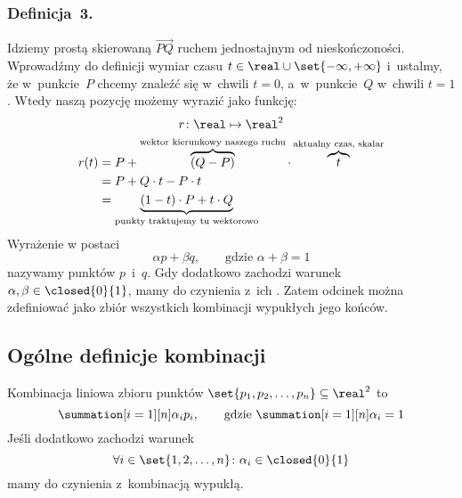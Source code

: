 \subsubsection*{Definicja~3.}
Idziemy prostą skierowaną \(\vec{PQ}\) ruchem jednostajnym od nieskończoności. Wprowadźmy do definicji wymiar czasu \(t \in \real \cup \set{-\infty, +\infty}\) i~ustalmy, że w~punkcie~\(P\) chcemy znaleźć się w~chwili \(t = 0\), a~w~punkcie~\(Q\) w~chwili \(t = 1\). Wtedy naszą pozycję możemy wyrazić jako funkcję:
\begin{gather*}
    r\colon \real \mapsto \real^2\\
    \begin{split}
        r(t) &= P + \overbrace{(Q - P)}^{\text{wektor kierunkowy naszego ruchu}} \cdot \overbrace{t}^{\text{aktualny czas, skalar}}\\
            &= P + Q \cdot t - P \cdot t\\
            &= \underbrace{(1 - t) \cdot P + t \cdot Q}_{\text{punkty traktujemy tu wektorowo}}
    \end{split}
\end{gather*}
Wyrażenie w postaci
\begin{equation*}
    \alpha p + \beta q,\qquad \text{gdzie } \alpha + \beta = 1
\end{equation*}
nazywamy  punktów \(p\)~i~\(q\). Gdy dodatkowo zachodzi warunek \(\alpha, \beta \in \closed{0}{1}\), mamy do czynienia z~ich . Zatem odcinek można zdefiniować jako zbiór wszystkich kombinacji wypukłych jego końców.
\subsection*{Ogólne definicje kombinacji}
Kombinacja liniowa zbioru punktów \(\set{p_1, p_2, \ldots, p_n} \subseteq \real^2\) to
\begin{equation*}
    \summation[i = 1][n]\alpha_ip_i,\qquad \text{gdzie } \summation[i = 1][n] \alpha_i = 1
\end{equation*}
Jeśli dodatkowo zachodzi warunek
\begin{equation*}
    \forall i \in \set{1, 2, \ldots, n}\colon \alpha_i \in \closed{0}{1}
\end{equation*}
mamy do czynienia z~kombinacją wypukłą.
